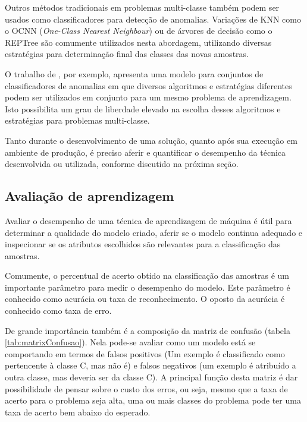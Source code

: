 Outros métodos tradicionais em problemas multi-classe também podem ser usados como classificadores para detecção de anomalias. Variações de KNN como o OCNN (\textit{One-Class Nearest Neighbour}) ou de árvores de decisão como o REPTree são comumente utilizados nesta abordagem, utilizando diversas estratégias para determinação final das classes das novas amostras.

O trabalho de , por exemplo, apresenta uma modelo para conjuntos de classificadores de anomalias em que diversos algoritmos e estratégias diferentes podem ser utilizados em conjunto para um mesmo problema de aprendizagem. Isto possibilita um grau de liberdade elevado na escolha desses algoritmos e estratégias para problemas multi-classe.

Tanto durante o desenvolvimento de uma solução, quanto após sua execução em ambiente de produção, é preciso aferir e quantificar o desempenho da técnica desenvolvida ou utilizada, conforme discutido na próxima seção.

\subsection{Avaliação de aprendizagem}\label{sec:avaliacao}

Avaliar o desempenho de uma técnica de aprendizagem de máquina é útil para determinar a qualidade do modelo criado, aferir se o modelo continua adequado e inspecionar se os atributos escolhidos são relevantes para a classificação das amostras.

Comumente, o percentual de acerto obtido na classificação das amostras é um importante parâmetro para medir o desempenho do modelo. Este parâmetro é conhecido como acurácia ou taxa de reconhecimento. O oposto da acurácia é conhecido como taxa de erro.

De grande importância também é a composição da matriz de confusão (tabela \ref{tab:matrixConfusao}). Nela pode-se avaliar como um modelo está se comportando em termos de falsos positivos (Um exemplo é classificado como pertencente à classe C, mas não é) e falsos negativos (um exemplo é atribuído a outra classe, mas deveria ser da classe C). A principal função desta matriz é dar possibilidade de pensar sobre o custo dos erros, ou seja, mesmo que a taxa de acerto para o problema seja alta, uma ou mais classes do problema pode ter uma taxa de acerto bem abaixo do esperado.

